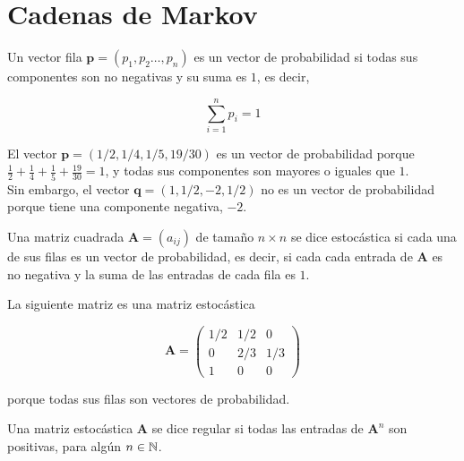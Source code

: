 \chapter{Cadenas de Markov}

\begin{defi}
Un vector fila $\mathbf{p} = (p_1,p_2\dots,p_n)$ es un vector de probabilidad si todas sus componentes son no negativas y su suma es $1$, es decir,

\[ \sum\limits_{i=1}^{n} p_i = 1 \]
\end{defi}

\begin{ejemplo}
El vector $\mathbf{p} = (1/2, 1/4, 1/5, 19/30)$ es un vector de probabilidad porque $\frac{1}{2} + \frac{1}{4} + \frac{1}{5} + \frac{19}{30} = 1$, y todas sus componentes son mayores o iguales que $1$. \\
Sin embargo, el vector $\mathbf{q} = (1, 1/2, -2, 1/2)$ no es un vector de probabilidad porque tiene una componente negativa, $-2$.
\end{ejemplo}

\begin{defi}
Una matriz cuadrada $\mathbf{A} = (a_{ij})$ de tamaño $n \times n$ se dice estocástica si cada una de sus filas es un vector de probabilidad, es decir, si cada cada entrada de $\mathbf{A}$ es no negativa y la suma de las entradas de cada fila es $1$.
\end{defi}

\begin{ejemplo}
La siguiente matriz es una matriz estocástica 

\[\mathbf{A} = \left(\begin{array}{ccc}
1/2 & 1/2 & 0\\
0   & 2/3 & 1/3\\
1   &  0  & 0
\end{array}\right) \]

porque todas sus filas son vectores de probabilidad.
\end{ejemplo}

\begin{defi}
Una matriz estocástica $\mathbf{A}$ se dice regular si todas las entradas de $\mathbf{A}^n$ son positivas, para algún $n \in \mathbb{N}$.
\end{defi}

